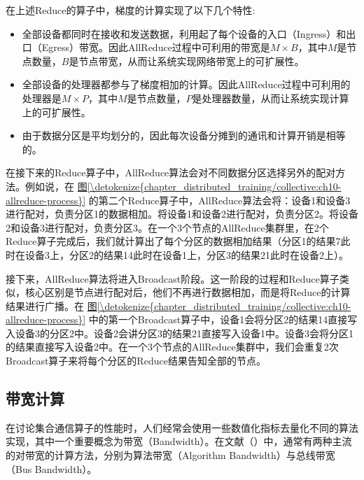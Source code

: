 \documentclass[letterpaper,10pt,english]{sphinxmanual}
\begin{document}
\sphinxAtStartPar
在上述Reduce的算子中，梯度的计算实现了以下几个特性:
\begin{itemize}
\item {} 
\sphinxAtStartPar
{}
全部设备都同时在接收和发送数据，利用起了每个设备的入口（Ingress）和出口（Egress）带宽。因此AllReduce过程中可利用的带宽是\(M \times B\)，其中\(M\)是节点数量，\(B\)是节点带宽，从而让系统实现网络带宽上的可扩展性。

\item {} 
\sphinxAtStartPar
{}
全部设备的处理器都参与了梯度相加的计算。因此AllReduce过程中可利用的处理器是\(M \times P\)，其中\(M\)是节点数量，\(P\)是处理器数量，从而让系统实现计算上的可扩展性。

\item {} 
\sphinxAtStartPar
{}
由于数据分区是平均划分的，因此每次设备分摊到的通讯和计算开销是相等的。

\end{itemize}

\sphinxAtStartPar
在接下来的Reduce算子中，AllReduce算法会对不同数据分区选择另外的配对方法。例如说，在
\hyperref[\detokenize{chapter_distributed_training/collective:ch10-allreduce-process}]{图\ref{\detokenize{chapter_distributed_training/collective:ch10-allreduce-process}}}
的第二个Reduce算子中，AllReduce算法会将：设备1和设备3进行配对，负责分区1的数据相加。将设备1和设备2进行配对，负责分区2。将设备2和设备3进行配对，负责分区3。在一个3个节点的AllReduce集群里，在2个Reduce算子完成后，我们就计算出了每个分区的数据相加结果（分区1的结果7此时在设备3上，分区2的结果14此时在设备1上，分区3的结果21此时在设备2上）。

\sphinxAtStartPar
接下来，AllReduce算法将进入Broadcast阶段。这一阶段的过程和Reduce算子类似，核心区别是节点进行配对后，他们不再进行数据相加，而是将Reduce的计算结果进行广播。在
\hyperref[\detokenize{chapter_distributed_training/collective:ch10-allreduce-process}]{图\ref{\detokenize{chapter_distributed_training/collective:ch10-allreduce-process}}}
中的第一个Broadcast算子中，设备1会将分区2的结果14直接写入设备3的分区2中。设备2会讲分区3的结果21直接写入设备1中。设备3会将分区1的结果直接写入设备2中。在一个3个节点的AllReduce集群中，我们会重复2次Broadcast算子来将每个分区的Reduce结果告知全部的节点。


\subsection{带宽计算}
\label{\detokenize{chapter_distributed_training/collective:id9}}
\sphinxAtStartPar
在讨论集合通信算子的性能时，人们经常会使用一些数值化指标去量化不同的算法实现，其中一个重要概念为带宽（Bandwidth）。在文献（）中，通常有两种主流的对带宽的计算方法，分别为算法带宽（Algorithm
Bandwidth）与总线带宽（Bus Bandwidth）。
\end{document}
